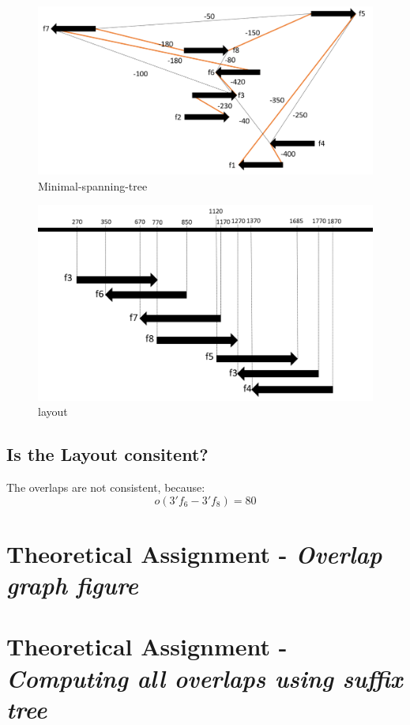 \documentclass[%
   10pt,              %
   ngerman,           %
   a4paper,           %
   DIV11,             %
]{scrartcl}%
\begin{document}
\begin{figure}[h]
	\includegraphics[width=\textwidth]{minimal-Spanning-Tree.png}
	\caption{Minimal-spanning-tree}
\end{figure}


\begin{figure}[h]
	\includegraphics[width=\textwidth]{layout.png}
	\caption{layout}
\end{figure}

\subsection*{Is the Layout consitent?}
The overlaps are not consistent, because:
\begin{equation*}
o(3'f_6 - 3'f_8)=80
\end{equation*}
\section*{Theoretical Assignment - \textit{Overlap graph figure}}
 
 
\section*{Theoretical Assignment - \textit{Computing all overlaps using suffix tree}}
\end{document}
